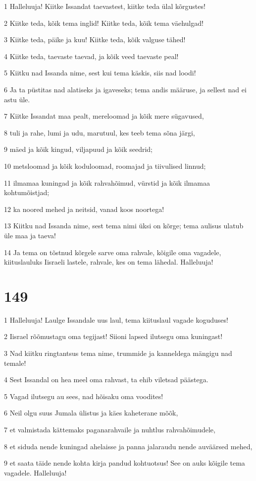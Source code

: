 \par 1 Halleluuja! Kiitke Issandat taevastest, kiitke teda ülal kõrgustes!
\par 2 Kiitke teda, kõik tema inglid! Kiitke teda, kõik tema väehulgad!
\par 3 Kiitke teda, päike ja kuu! Kiitke teda, kõik valguse tähed!
\par 4 Kiitke teda, taevaste taevad, ja kõik veed taevaste peal!
\par 5 Kiitku nad Issanda nime, sest kui tema käskis, siis nad loodi!
\par 6 Ja ta püstitas nad alatiseks ja igaveseks; tema andis määruse, ja sellest nad ei astu üle.
\par 7 Kiitke Issandat maa pealt, mereloomad ja kõik mere sügavused,
\par 8 tuli ja rahe, lumi ja udu, marutuul, kes teeb tema sõna järgi,
\par 9 mäed ja kõik kingud, viljapuud ja kõik seedrid;
\par 10 metsloomad ja kõik koduloomad, roomajad ja tiivulised linnud;
\par 11 ilmamaa kuningad ja kõik rahvahõimud, vürstid ja kõik ilmamaa kohtumõistjad;
\par 12 ka noored mehed ja neitsid, vanad koos noortega!
\par 13 Kiitku nad Issanda nime, sest tema nimi üksi on kõrge; tema aulisus ulatub üle maa ja taeva!
\par 14 Ja tema on tõstnud kõrgele sarve oma rahvale, kõigile oma vagadele, kiituslauluks Iisraeli lastele, rahvale, kes on tema lähedal. Halleluuja!

\chapter{149}

\par 1 Halleluuja! Laulge Issandale uus laul, tema kiituslaul vagade koguduses!
\par 2 Iisrael rõõmustagu oma tegijast! Siioni lapsed ilutsegu oma kuningast!
\par 3 Nad kiitku ringtantsus tema nime, trummide ja kanneldega mängigu nad temale!
\par 4 Sest Issandal on hea meel oma rahvast, ta ehib viletsad päästega.
\par 5 Vagad ilutsegu au sees, nad hõisaku oma voodites!
\par 6 Neil olgu suus Jumala ülistus ja käes kaheterane mõõk,
\par 7 et valmistada kättemaks paganarahvaile ja nuhtlus rahvahõimudele,
\par 8 et siduda nende kuningad ahelaisse ja panna jalaraudu nende auväärsed mehed,
\par 9 et saata täide nende kohta kirja pandud kohtuotsus! See on auks kõigile tema vagadele. Halleluuja!

